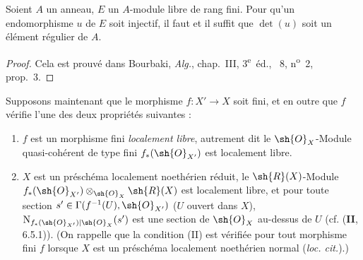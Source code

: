 \begin{lemma}[21.5.2]
\label{IV.21.5.2}
Soient $A$ un anneau, $E$ un $A$-module libre de rang fini.
Pour qu'un endomorphisme $u$ de $E$ soit injectif, il faut et il suffit que $\det(u)$ soit un élément régulier de $A$.
\end{lemma}

\begin{proof}
Cela est prouvé dans Bourbaki, \emph{Alg.}, chap.~III, 3\textsuperscript{e}~éd., \textsection~8, n\textsuperscript{o}~2, prop.~3.
\end{proof}

\begin{env}[21.5.3]
Supposons maintenant que le morphisme $f:X'\to X$ soit fini, et en outre que $f$ vérifie l'une des deux propriétés suivantes :
\begin{enumerate}[label=\Roman*)]
  \item $f$ est un morphisme fini \emph{localement libre}, autrement dit  le $\sh{O}_X$-Module quasi-cohérent de type fini $f_*(\sh{O}_{X'})$ est localement libre.
  \item $X$ est un préschéma localement noethérien réduit, le $\sh{R}(X)$-Module $f_*(\sh{O}_{X'})\otimes_{\sh{O}_X}\sh{R}(X)$ est localement libre, et pour toute section $s'\in\Gamma(f^{-1}(U),\sh{O}_{X'})$ ($U$ ouvert
  dans $X$), $\mathrm{N}_{f_*(\sh{O}_{X'})|\sh{O}_X}(s')$ est une section de $\sh{O}_X$ au-dessus de $U$ (cf. (\textbf{II}, 6.5.1)).
  (On rappelle que la condition (II) est vérifiée pour tout morphisme fini $f$ lorsque $X$ est un préschéma localement noethérien normal (\emph{loc. cit.}).)
\end{enumerate}


\end{env}

